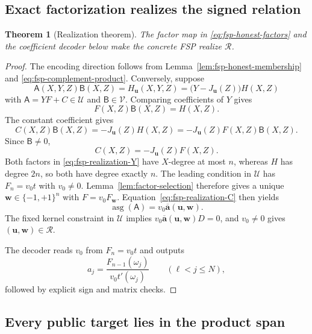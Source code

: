 \documentclass[11pt]{article}
\newtheorem{theorem}{Theorem}[section]
\theoremstyle{definition}
\newcommand{\cR}{\mathcal R}
\newcommand{\cU}{\mathcal U}
\newcommand{\cV}{\mathcal V}
\newcommand{\asg}{\operatorname{asg}}
\begin{document}
\subsection{Exact factorization realizes the signed relation}

\begin{theorem}[Realization theorem]
\label{thm:fsp-realization-concrete}
The factor map in \eqref{eq:fsp-honest-factors} and the coefficient decoder
below make the concrete FSP realize $\cR$.
\end{theorem}

\begin{proof}
The encoding direction follows from Lemma~\ref{lem:fsp-honest-membership} and
\eqref{eq:fsp-complement-product}.  Conversely, suppose
\[
  \mathsf A(X,Y,Z)\mathsf B(X,Z)=H_{\mathbf u}(X,Y,Z)
  =\bigl(Y-J_{\mathbf u}(Z)\bigr)H(X,Z)
\]
with $\mathsf A=YF+C\in\cU$ and $\mathsf B\in\cV$.
Comparing coefficients of $Y$ gives
\begin{equation}
  F(X,Z)\mathsf B(X,Z)=H(X,Z).
  \label{eq:fsp-realization-Y}
\end{equation}
The constant coefficient gives
\[
  C(X,Z)\mathsf B(X,Z)
  =-J_{\mathbf u}(Z)H(X,Z)
  =-J_{\mathbf u}(Z)F(X,Z)\mathsf B(X,Z).
\]
Since $\mathsf B\ne0$,
\begin{equation}
  C(X,Z)=-J_{\mathbf u}(Z)F(X,Z).
  \label{eq:fsp-realization-C}
\end{equation}
Both factors in \eqref{eq:fsp-realization-Y} have $X$-degree at most $n$,
whereas $H$ has degree $2n$, so both have degree exactly $n$.  The leading
condition in $\cU$ has $F_n=v_0t$ with $v_0\ne0$.  Lemma~\ref{lem:factor-selection}
therefore gives a unique $\mathbf w\in\{-1,+1\}^n$ with
$F=v_0F_{\mathbf w}$.  Equation~\eqref{eq:fsp-realization-C} then yields
\[
  \asg(\mathsf A)
  =v_0\overline{\mathbf a}(\mathbf u,\mathbf w).
\]
The fixed kernel constraint in $\cU$ implies
$v_0\overline{\mathbf a}(\mathbf u,\mathbf w)D=0$, and $v_0\ne0$ gives
$(\mathbf u,\mathbf w)\in\cR$.

The decoder reads $v_0$ from $F_n=v_0t$ and outputs
\begin{equation}
  a_j=\frac{F_{n-1}(\omega_j)}{v_0t'(\omega_j)}
  \qquad(\ell<j\le N),
  \label{eq:fsp-decoder}
\end{equation}
followed by explicit sign and matrix checks.
\end{proof}

\subsection{Every public target lies in the product span}
\end{document}
